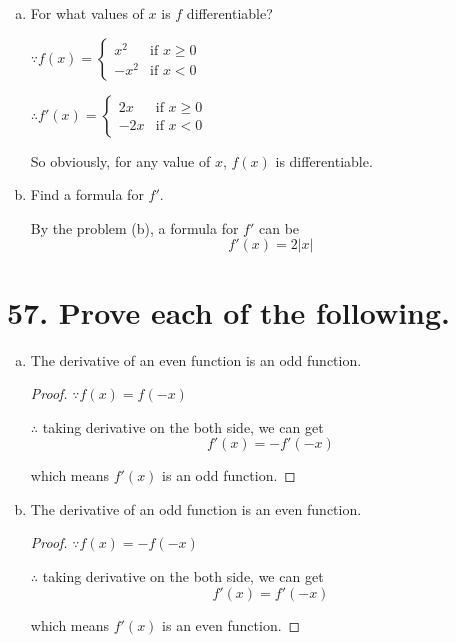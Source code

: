 \documentclass{article}
\begin{document}
\begin{enumerate}[(a)]
        \item For what values of $x$ is $f$ differentiable?

        $\because f(x) = \left\{ \begin{array}{ll}
            x^2 & \textrm{if $x \geq 0$} \\
            -x^2 & \textrm{if $x < 0$} 
        \end{array} \right. $

        $\therefore f'(x) = \left\{ \begin{array}{ll}
            2x & \textrm{if $x \geq 0$} \\
            -2x & \textrm{if $x < 0$}
        \end{array} \right.$

        So obviously, for any value of $x$, $f(x)$ is differentiable.
        \item Find a formula for $f'$.

        By the problem (b), a formula for $f'$ can be $$f'(x) = 2|x|$$

    \end{enumerate}

    \section*{57. Prove each of the following.}

    \begin{enumerate}[(a)]
        \item The derivative of an even function is an odd function.

        \begin{proof}
            $\because f(x) = f(-x)$

            $\therefore$ taking derivative on the both side, we can get$$f'(x) = -f'(-x)$$

            which means $f'(x)$ is an odd function.
        \end{proof}

        \item The derivative of an odd function is an even function.

        \begin{proof}
            $\because f(x) = -f(-x)$

            $\therefore$ taking derivative on the both side, we can get $$f'(x) = f'(-x)$$

            which means $f'(x)$ is an even function.
        \end{proof}
    \end{enumerate}
\end{document}
